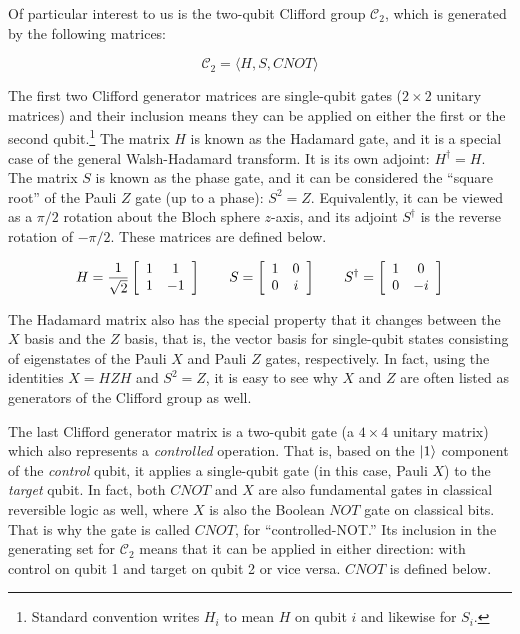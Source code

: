 Of particular interest to us is the two-qubit Clifford group $\mathcal{C}_2$,
which is generated by the following matrices:

\begin{equation}
\mathcal{C}_2 = \langle H, S, CNOT \rangle
\end{equation}

The first two Clifford generator matrices are single-qubit gates ($2 \times 2$ unitary matrices) and
their inclusion means they can be applied on either the first or the second
qubit.\footnote{Standard convention writes $H_i$ to mean $H$ on qubit $i$ and likewise for $S_i$.}
The matrix $H$ is known as the Hadamard gate, and it is a special case of the
general Walsh-Hadamard transform. It is its own adjoint: $H^{\dagger} = H$.
The matrix $S$ is known as the phase gate, and it can be considered the
``square root'' of the Pauli $Z$ gate (up to a phase): $S^2 = Z$.
Equivalently, it can be viewed as a $\pi/2$ rotation about the Bloch sphere
$z$-axis, and its adjoint $S^{\dagger}$ is the reverse rotation of $-\pi /2$.
These matrices are defined below.

\begin{equation}
H = \frac{1}{\sqrt{2}}
 \left[
  \begin{array}{cc}
    1 & 1 \\
    1 & -1 \\
  \end{array} \right]
\qquad
S = 
 \left[
  \begin{array}{cc}
    1 & 0 \\
    0 & i \\
  \end{array} \right]
\qquad
S^{\dagger} = 
 \left[
  \begin{array}{cc}
    1 & 0 \\
    0 & -i \\
  \end{array} \right]
\end{equation}

The Hadamard matrix also has the special property that it changes between the
$X$ basis and the $Z$ basis, that is, the vector basis for single-qubit
states consisting of eigenstates of the Pauli $X$ and Pauli $Z$ gates,
respectively. In fact, using the identities $X = HZH$ and $S^2 = Z$, it
is easy to see why $X$ and $Z$ are often listed as generators of the
Clifford group as well.

The last Clifford generator matrix is a two-qubit gate (a $4 \times 4$ unitary matrix) which
also represents a \emph{controlled} operation. That is, based on the
$\left\vert{1}\right\rangle$ component of the \emph{control} qubit, it applies a single-qubit
gate (in this case, Pauli $X$) to the \emph{target} qubit.
In fact,
both $CNOT$ and $X$ are also fundamental gates in classical reversible
logic as well, where $X$ is also the Boolean $NOT$ gate on classical bits.
That is why the gate is called $CNOT$, for ``controlled-NOT.'' Its inclusion
in the generating set for $\mathcal{C}_2$ means that it can be applied
in either direction: with control on qubit 1 and target on qubit 2 or
vice versa. $CNOT$ is defined below.

